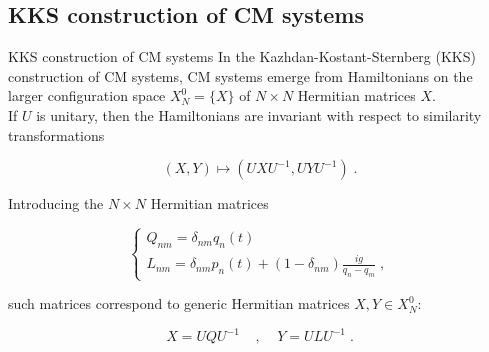 \documentclass[aspectratio=169, 9pt]{beamer}
\begin{document}
\subsection{KKS construction of CM systems}
\begin{frame}{KKS construction of CM systems}
In the Kazhdan-Kostant-Sternberg (KKS) construction of CM systems, CM systems emerge from Hamiltonians on the larger configuration space $X^0_N = \{X\}$ of $N \times N$ Hermitian matrices $X$. \\
If $U$ is unitary, then the Hamiltonians are invariant with respect to similarity transformations

\begin{equation}
    (X, Y) \mapsto (UXU^{-1}, UYU^{-1})\;.
\end{equation}

Introducing the $N \times N$ Hermitian matrices

\begin{equation}
\begin{cases}
Q_{nm} = \delta_{nm} q_n(t) \\
L_{nm} = \delta_{nm}p_n(t) + (1 - \delta_{nm}) \frac{ig}{q_n - q_m}\;,
\end{cases}
\end{equation}

such matrices correspond to generic Hermitian matrices $X, Y \in X_N^0$:

\begin{equation}
    X = UQU^{-1}\;\;\;\;,\;\;\;\;Y = ULU^{-1}\;.
\end{equation}
\end{frame}
\end{document}
